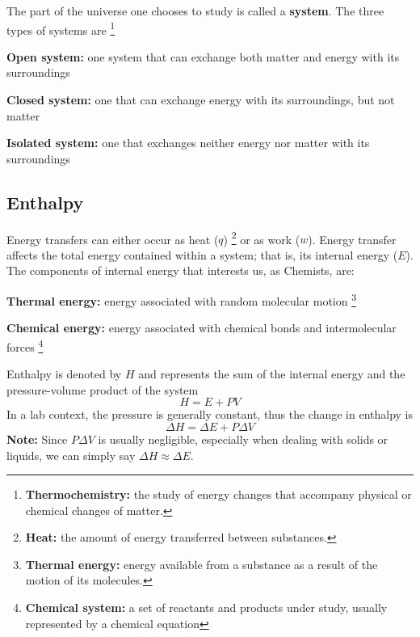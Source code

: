 The part of the universe one chooses to study is called a \textbf{system}. The three types of
systems are
\footnote{
    \textbf{Thermochemistry:} the study of energy changes that accompany physical or chemical changes
    of matter.
}
\begin{enum}
    \item \textbf{Open system:} one system that can exchange both matter and energy with its
        surroundings
    \item \textbf{Closed system:} one that can exchange energy with its surroundings, but not matter
    \item \textbf{Isolated system:} one that exchanges neither energy nor matter with its
        surroundings
\end{enum}

\subsection{Enthalpy}
Energy transfers can either occur as heat ($q$)
\footnote{
    \textbf{Heat:} the amount of energy transferred between substances.
}
or as work ($w$). Energy transfer affects the total
energy contained within a system; that is, its internal energy ($E$).\\

The components of internal energy that interests us, as Chemists, are:
\begin{bulleted-list}
    \item \textbf{Thermal energy:} energy associated with random molecular motion
        \footnote{
            \textbf{Thermal energy:} energy available from a substance as a result of the motion
            of its molecules.
        }
    \item \textbf{Chemical energy:} energy associated with chemical bonds and intermolecular forces
        \footnote{
            \textbf{Chemical system:} a set of reactants and products under study, usually
            represented by a chemical equation
        }
\end{bulleted-list}
Enthalpy is denoted by $H$ and represents the sum of the internal energy and the pressure-volume
product of the system
\[
    H=E+PV
\]
In a lab context, the pressure is generally constant, thus the change in enthalpy is
\[
    \Delta H=\Delta E+P\Delta V
\]
\textbf{Note:} Since $P\Delta V$ is usually negligible, especially when dealing with solids or
liquids, we can simply say $\Delta H\approx\Delta E$.\\

